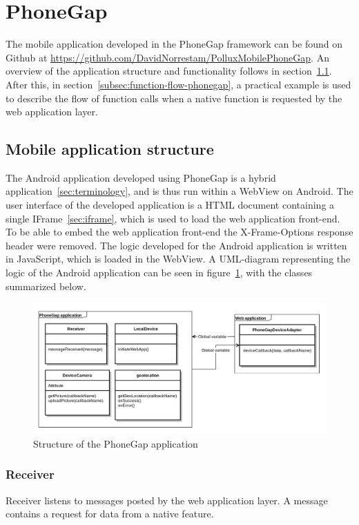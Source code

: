 \section{PhoneGap}\label{sec:phonegap}
The mobile application developed in the PhoneGap framework can be found on Github at \url{https://github.com/DavidNorrestam/PolluxMobilePhoneGap}. An overview of the application structure and functionality follows in section~\ref{subsec:application-structure-phonegap}. After this, in section~\ref{subsec:function-flow-phonegap}, a practical example is used to describe the flow of function calls when a native function is requested by the web application layer.


\subsection{Mobile application structure} \label{subsec:application-structure-phonegap}
The Android application developed using PhoneGap is a hybrid application~\ref{sec:terminology}, and is thus run within a WebView on Android. The user interface of the developed application is a HTML document containing a single IFrame~\ref{sec:iframe}, which is used to load the web application front-end. To be able to embed the web application front-end the X-Frame-Options response header were removed. The logic developed for the Android application is written in JavaScript, which is loaded in the WebView. A UML-diagram representing the logic of the Android application can be seen in figure~\ref{fig:phonegapuml}, with the classes summarized below.
\begin{figure}[h!]
	\centering
    \includegraphics[width=150mm,natwidth=1000,natheight=750]{./img/phonegapuml.png}
    \caption{Structure of the PhoneGap application}
    \label{fig:phonegapuml}
\end{figure}

\subsubsection{Receiver}
Receiver listens to messages posted by the web application layer. A message contains a request for data from a native feature.
